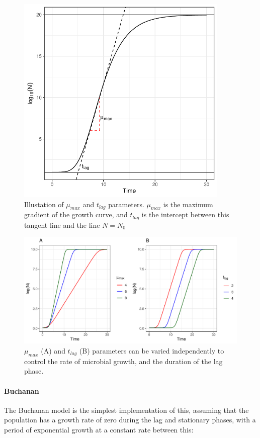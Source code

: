 \documentclass[11pt, a4paper]{article}
\begin{document}
\begin{linenumbers}
        \begin{figure}[H]
        \centering
        \includegraphics[width=4in]{../results/4_param_demo.pdf}
        \caption{Illustation of $\mu_{max}$ and $t_{lag}$ parameters. $\mu_{max}$ is the maximum gradient of the growth curve, and $t_{lag}$ is the intercept between this tangent line and the line $N = N_0$}
        \label{fig:4_param_demo}
        \end{figure}


        \begin{figure}[H]
        \includegraphics[width=\linewidth]{../results/tlag_rmax_demo.pdf}
        \caption{ $\mu_{max}$ (A) and $t_{lag}$ (B) parameters can be varied independently to control the rate of microbial growth, and the duration of the lag phase.}
        \label{fig:parameter_variation_demo}
        \end{figure}



\paragraph*{Buchanan}
The Buchanan model \cite{Buchanan} is the simplest implementation of this, assuming that the population has a growth rate of zero during the lag and stationary phases, with a period of exponential growth at a constant rate between this:


\end{linenumbers}
\end{document}
